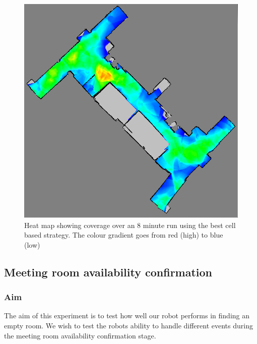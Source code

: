 \documentclass[conference]{IEEEtran}
\begin{document}
\begin{figure}
  \includegraphics[width=\columnwidth]{4-1_1_heatmap}
  \caption{Heat map showing coverage over an 8 minute run using the best cell based strategy. The colour gradient goes from red (high) to blue (low)}
  \label{fig:heatmap}
\end{figure}

\subsection{Meeting room availability confirmation}
\subsubsection{Aim}
The aim of this experiment is to test how well our robot performs in finding an empty room. We wish to test the robots ability to handle different events during the meeting room availability confirmation stage.
\end{document}
